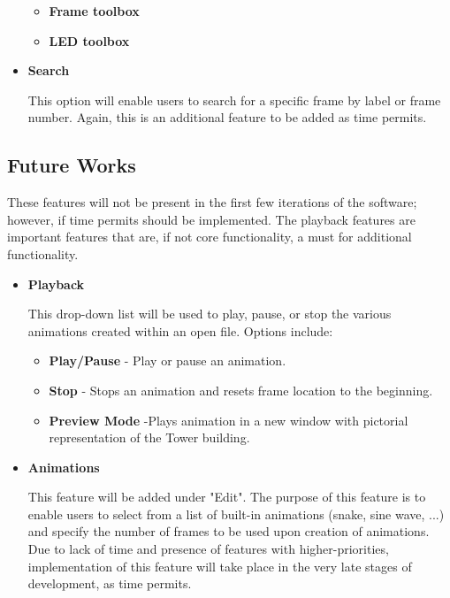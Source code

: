 \documentclass[]{article}
\begin{document}
\begin{itemize}
	\begin{itemize}
	\item \textbf{Frame toolbox}
	\item \textbf{LED toolbox}

	\end{itemize}

\item \textbf{Search}

{This option will enable users to search for a specific frame by label or frame number.  Again, this is an additional feature to be added as time permits.}

\end{itemize}

\subsection{Future Works}

{These features will not be present in the first few iterations of the software; however, if time permits should be implemented.  The playback features are important features that are, if not core functionality, a must for additional functionality. }

\begin{itemize}
\item \textbf{Playback}

{This drop-down list will be used to play, pause, or stop the various animations created within an open file. Options include: }
	\begin{itemize}
	\item \textbf{Play/Pause} - Play or pause an animation.
	\item \textbf{Stop} - Stops an animation and resets frame location to the beginning.
	\item \textbf{Preview Mode} -Plays animation in a new window with pictorial representation of the Tower building.

	\end{itemize}

\item \textbf{Animations}

{This feature will be added under "Edit". The purpose of this feature is to enable users to select from a list of built-in animations (snake, sine wave, ...) and specify the number of frames to be used upon creation of animations. Due to lack of time and presence of features with higher-priorities, implementation of this feature will take place in the very late stages of development, as time permits. }

\end{itemize}
\end{document}
